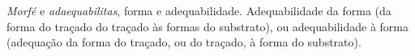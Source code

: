 \documentclass[twoside, 12pt, english,italian,latin,greek,french,spanish,brazil]{book}
\begin{document}


        \textit{Morfé} e \textit{adaequabilitas}, forma e adequabilidade.
        Adequabilidade da forma (da forma do traçado do traçado às formas do substrato), ou adequabilidade à forma (adequação da forma do traçado, ou do traçado, à forma do substrato).
\end{document}
